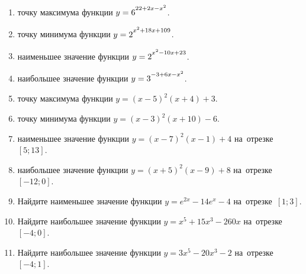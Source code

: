\documentclass[a4paper,10pt]{article}
\begin{document}
\begin{enumerate}
\item {} точку максимума функции $y=6\strut^{22+2x-x^2}$.

\item {} точку минимума функции $y=2\strut^{x^2+18x+109}$.

\item {} наименьшее значение функции $y=2\strut^{x^2-10x+23}$.

\item {} наибольшее значение функции $y=3\strut^{-3+6x-x^2}$.

\item {} точку максимума функции $y=\left(x-5\right)^2\left(x+4\right)+3$.

\item {} точку минимума функции $y=\left(x-3\right)^2\left(x+10\right)-6$.

\item {} наименьшее значение функции $y=\left(x-7\right)^2\left(x-1\right)+4$ на~отрезке~$\left[5;13\right]$.

\item {} наибольшее значение функции $y=\left(x+5\right)^2\left(x-9\right)+8$ на~отрезке~$\left[-12;0\right]$.

\item Найдите наименьшее значение функции $y=e^{2x}-14e^x-4$ на~отрезке~$\left[1;3\right]$.

\item Найдите наибольшее значение функции $y=x^5+15x^3-260x$ на~отрезке~$\left[-4;0\right]$.

\item Найдите наибольшее значение функции $y=3x^5-20x^3-2$ на~отрезке~$\left[-4;1\right]$.

\end{enumerate}
\end{document}
